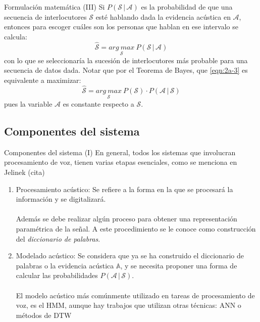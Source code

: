 \begin{frame}{Formulación matemática (III)}
  Si $P(\mathcal{S} \,|\, \mathcal{A})$ es la probabilidad de que una secuencia de interlocutores $\mathcal{S}$ esté hablando dada la evidencia acústica en $\mathcal{A}$, entonces para escoger cuáles son los personas que hablan en ese intervalo se calcula:
  \begin{equation}
  \hat{\mathcal{S}} = \underset{\mathcal{S}}{arg~max}~ P(\mathcal{S} \,|\, \mathcal{A})
  \label{eqn:2a-3}
  \end{equation}
  con lo que se seleccionaría la sucesión de interlocutores más probable para una secuencia de datos dada.
  \vfill
  Notar que por el Teorema de Bayes, que \eqref{eqn:2a-3} es equivalente a maximizar: 
  \begin{equation}
  \hat{\mathcal{S}} = \underset{\mathcal{S}}{arg~max}~ P(\mathcal{S}) \cdot P(\mathcal{A} \,|\, \mathcal{S})
  \label{eqn:2a-6}
  \end{equation}
  pues la variable $\mathcal{A}$ es constante respecto a $\mathcal{S}$. %
\end{frame}

\subsection{Componentes del sistema}
\begin{frame}{Componentes del sistema (I)}
  En general, todos los sistemas que involucran procesamiento de
  voz, tienen varias etapas esenciales, como se menciona en Jelinek (cita)

  \begin{enumerate}
    \itemsep1em
    \item \alert{Procesamiento acústico:}
    Se refiere a la forma en la que se procesará la información y se digitalizará. %
    \\~\\\vspace{-0.5em}
    Además se debe realizar algún proceso para obtener una representación paramétrica de la señal. A este procedimiento se le conoce como construcción del \textit{diccionario de palabras}.

    \item \alert{Modelado acústico:}
    Se considera que ya se ha construido el diccionario de palabras o la evidencia acústica $\mathbb{A}$, y se necesita proponer una forma de calcular las probabilidades $P(\mathcal{A} \,|\, \mathcal{S})$. 
    \\~\\\vspace{-0.5em}
    El modelo acústico más comúnmente utilizado en tareas de procesamiento de voz, es el HMM, aunque hay trabajos que utilizan otras técnicas: ANN \cite{Jothilakshmi2009} \cite{Gutzwiller2010}  o métodos de DTW \cite{Huijbregts2011} 
  \end{enumerate}
\end{frame}

